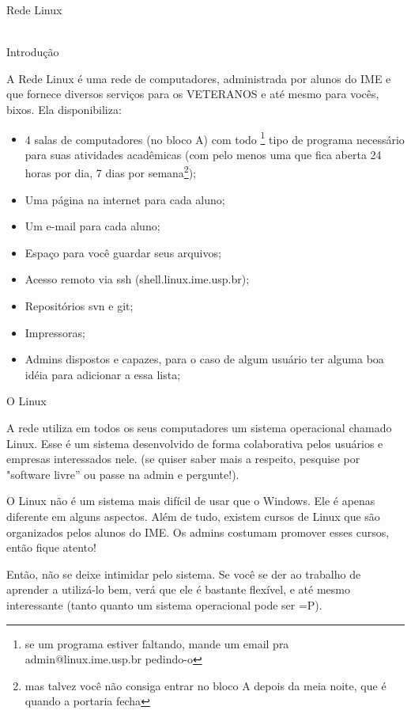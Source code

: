 \begin{secao}{Rede Linux}
\\
\\
\begin{subsecao}{Introdução}

A Rede Linux é uma rede de computadores, administrada por alunos do IME e
que fornece diversos serviços para os VETERANOS e até mesmo para vocês, bixos.
Ela disponibiliza:

\begin{itemize}
\item 4 salas de computadores (no bloco A) com todo \footnote{se um programa
estiver faltando, mande um email pra admin@linux.ime.usp.br pedindo-o} tipo de
programa necessário para suas atividades acadêmicas (com pelo menos uma que fica
aberta 24 horas por dia, 7 dias por semana\footnote{mas
talvez você não consiga entrar no bloco A depois da meia noite, que é quando a
portaria fecha});
\item Uma página na internet para cada aluno;
\item Um e-mail para cada aluno;
\item Espaço para você guardar seus arquivos;
\item Acesso remoto via ssh (shell.linux.ime.usp.br);
\item Repositórios svn e git;
\item Impressoras;
\item Admins dispostos e capazes, para o caso de algum usuário ter alguma boa
idéia para adicionar a essa lista;
\end{itemize}
\end{subsecao}

\begin{subsecao}{O Linux}

A rede utiliza em todos os seus computadores um sistema operacional chamado
Linux. Esse é um sistema desenvolvido de forma colaborativa pelos usuários
e empresas interessados nele. (se quiser saber mais a respeito, pesquise
por "software livre” ou passe na admin e pergunte!).

O Linux não é um sistema mais difícil de usar que o Windows. Ele é apenas
diferente em alguns aspectos. Além de tudo, existem cursos de Linux que são
organizados pelos alunos do IME. Os admins costumam promover esses cursos, então
fique atento!

Então, não se deixe intimidar pelo sistema. Se você se der ao trabalho de
aprender a utilizá-lo bem, verá que ele é bastante flexível, e até mesmo
interessante (tanto quanto um sistema operacional pode ser =P).


\end{subsecao}
\end{secao}
